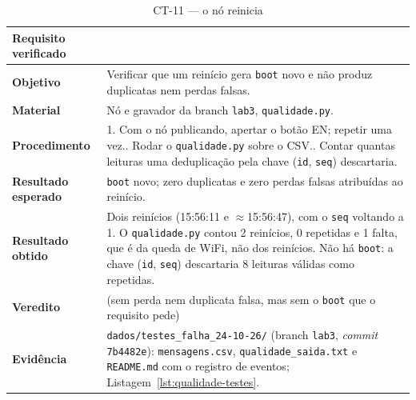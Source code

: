 \begin{table}[H]
\centering
\caption{CT-11 --- o nó reinicia}
\label{tab:ct11}
\footnotesize
\setlength{\tabcolsep}{3.5pt}
\begin{tabular}{@{}L{3.2cm}L{12.0cm}@{}}
\toprule
\textbf{Requisito verificado} &  \\
\midrule
\textbf{Objetivo} & Verificar que um reinício gera \texttt{boot} novo e não produz duplicatas nem perdas falsas. \\
\textbf{Material} & Nó e gravador da branch \texttt{lab3}, \texttt{qualidade.py}. \\
\textbf{Procedimento} &
  1. Com o nó publicando, apertar o botão EN; repetir uma vez.. Rodar o \texttt{qualidade.py} sobre o CSV.. Contar quantas leituras uma deduplicação pela chave (\texttt{id}, \texttt{seq}) descartaria. \\
\textbf{Resultado esperado} & \texttt{boot} novo; zero duplicatas e zero perdas falsas atribuídas ao reinício. \\
\textbf{Resultado obtido} & Dois reinícios (15:56:11 e $\approx$15:56:47), com o \texttt{seq} voltando a 1. O \texttt{qualidade.py} contou 2 reinícios, 0 repetidas e 1 falta, que é da queda de WiFi, não dos reinícios. Não há \texttt{boot}: a chave (\texttt{id}, \texttt{seq}) descartaria 8 leituras válidas como repetidas. \\
\textbf{Veredito} & \parcial{} (sem perda nem duplicata falsa, mas sem o \texttt{boot} que o requisito pede) \\
\textbf{Evidência} & \texttt{dados/testes\_falha\_24-10-26/} (branch \texttt{lab3}, \emph{commit} \texttt{7b4482e}): \texttt{mensagens.csv}, \texttt{qualidade\_saida.txt} e \texttt{README.md} com o registro de eventos; Listagem~\ref{lst:qualidade-testes}. \\
\bottomrule
\end{tabular}
\end{table}

